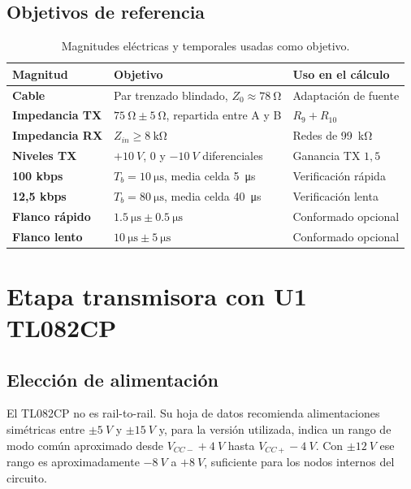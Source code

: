 \documentclass[11pt,a4paper]{article}
\begin{document}
\subsection{Objetivos de referencia}

\begin{table}[h]
\centering
\caption{Magnitudes eléctricas y temporales usadas como objetivo.}
\begin{tabularx}{\textwidth}{@{}>{\bfseries}l X l@{}}
\toprule
Magnitud & Objetivo & Uso en el cálculo \\
\midrule
Cable & Par trenzado blindado, $Z_0\approx\SI{78}{\ohm}$ & Adaptación de fuente \\
Impedancia TX & $\SI{75}{\ohm}\pm\SI{5}{\ohm}$, repartida entre A y B & $R_9+R_{10}$ \\
Impedancia RX & $Z_{in}\geq\SI{8}{\kilo\ohm}$ & Redes de \SI{99}{\kilo\ohm} \\
Niveles TX & $+\SI{10}{V}$, $0$ y $-\SI{10}{V}$ diferenciales & Ganancia TX $1{,}5$ \\
100 kbps & $T_b=\SI{10}{\micro\second}$, media celda \SI{5}{\micro\second} & Verificación rápida \\
12,5 kbps & $T_b=\SI{80}{\micro\second}$, media celda \SI{40}{\micro\second} & Verificación lenta \\
Flanco rápido & $\SI{1.5}{\micro\second}\pm\SI{0.5}{\micro\second}$ & Conformado opcional \\
Flanco lento & $\SI{10}{\micro\second}\pm\SI{5}{\micro\second}$ & Conformado opcional \\
\bottomrule
\end{tabularx}
\end{table}

\section{Etapa transmisora con U1 TL082CP}

\subsection{Elección de alimentación}

El TL082CP no es rail-to-rail. Su hoja de datos recomienda alimentaciones
simétricas entre $\pm\SI{5}{V}$ y $\pm\SI{15}{V}$ y, para la versión utilizada,
indica un rango de modo común aproximado desde $V_{CC-}+\SI{4}{V}$ hasta
$V_{CC+}-\SI{4}{V}$. Con $\pm\SI{12}{V}$ ese rango es aproximadamente
$-\SI{8}{V}$ a $+\SI{8}{V}$, suficiente para los nodos internos del circuito.
\end{document}
